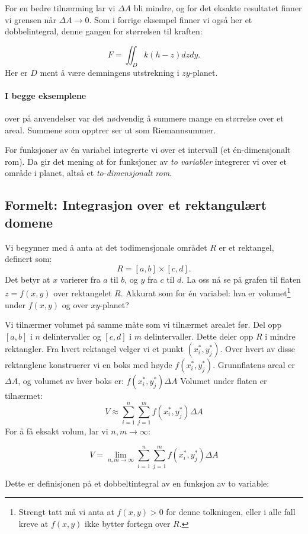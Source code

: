 For en bedre tilnærming lar vi \( \Delta A \) bli mindre, og for det eksakte resultatet finner vi grensen når \( \Delta A \to 0 \). Som i forrige eksempel finner vi også her et dobbelintegral, denne gangen for størrelsen til kraften:

\[F=\iint_Dk(h-z)dzdy.\]
Her er $D$ ment å være demningens utstrekning i $zy$-planet.

\paragraph{I begge eksemplene} over på anvendelser var det nødvendig å summere mange en størrelse over et areal. Summene som opptrer ser ut som Riemannsummer. 


For funksjoner av én variabel integrerte vi over et intervall (et én-dimensjonalt rom). Da gir det mening at for funksjoner av \textit{to variabler} integrerer vi over et område i planet, altså et \textit{to-dimensjonalt rom}. 


\subsection*{Formelt: Integrasjon over et rektangulært domene}
Vi begynner med å anta at det todimensjonale området \( R \) er et rektangel, definert som:
\[
R = [a, b] \times [c, d].
\]
Det betyr at \( x \) varierer fra \( a \) til \( b \), og \( y \) fra \( c \) til \( d \).
La oss nå se på grafen til flaten \( z = f(x, y) \) over rektangelet \( R \). Akkurat som for én variabel: hva er volumet\footnote{Strengt tatt må vi anta at $f(x,y)>0$ for denne tolkningen, eller i alle fall kreve at $f(x,y)$ ikke bytter fortegn over $R$.} under \( f(x, y) \) og over \( xy \)-planet?

Vi tilnærmer volumet på samme måte som vi tilnærmet arealet før. Del opp \( [a, b] \) i \( n \) delintervaller og \( [c, d] \) i \( m \) delintervaller. Dette deler opp \( R \) i mindre rektangler. Fra hvert rektangel velger vi et punkt \( (x_i^*, y_j^*) \). Over hvert av disse rektanglene konstruerer vi en boks med høyde \( f(x_i^*, y_j^*) \). Grunnflatens areal er \( \Delta A \), og volumet av hver boks er:
\(
f(x_i^*, y_j^*) \Delta A
\)
Volumet under flaten er tilnærmet:
\[
V \approx \sum_{i=1}^n \sum_{j=1}^m f(x_i^*, y_j^*) \Delta A
\]
For å få eksakt volum, lar vi \( n, m \to \infty \):

\[
V = \lim_{n, m \to \infty} \sum_{i=1}^n \sum_{j=1}^m f(x_i^*, y_j^*) \Delta A
\]

Dette er definisjonen på et dobbeltintegral av en funksjon av to variable:

